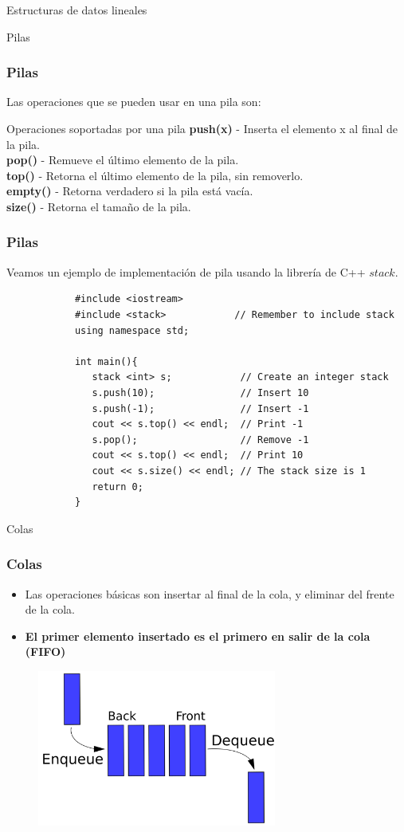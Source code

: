 \documentclass{beamer}
\begin{document}
\begin{section}{Estructuras de datos lineales}
\begin{subsection}{Pilas}
	\begin{frame}[fragile]
		\frametitle{Pilas}
		Las operaciones que se pueden usar en una pila son:
		\begin{block}{Operaciones soportadas por una pila}
			\textbf{push(x)} - Inserta el elemento x al final de la pila.\\
			\textbf{pop()} - Remueve el último elemento de la pila.\\
			\textbf{top()} - Retorna el último elemento de la pila, sin removerlo.\\
			\textbf{empty()} - Retorna verdadero si la pila está vacía.\\
			\textbf{size()} - Retorna el tamaño de la pila.			
		\end{block}		
	\end{frame}
	
	\begin{frame}[fragile]
		\frametitle{Pilas}
		Veamos un ejemplo de implementación de pila usando la librería de C++ $stack$.
		\begin{lstlisting}
			#include <iostream>
			#include <stack>            // Remember to include stack
			using namespace std;

			int main(){
			   stack <int> s;            // Create an integer stack
			   s.push(10);               // Insert 10
			   s.push(-1);               // Insert -1
			   cout << s.top() << endl;  // Print -1
			   s.pop();                  // Remove -1
			   cout << s.top() << endl;  // Print 10
			   cout << s.size() << endl; // The stack size is 1
			   return 0;
			}
		\end{lstlisting}
	\end{frame}

\end{subsection}


\begin{subsection}{Colas}
	\begin{frame}[fragile]
		\frametitle{Colas}
		\begin{itemize}
			\item {Las operaciones básicas son insertar al final de la cola, y eliminar del frente de la cola.}
			\item {\textbf{El primer elemento insertado es el primero en salir de la cola (FIFO)}}
		\end{itemize}
		\begin{figure}
			\includegraphics[width = 0.7\textwidth]{src/cola.jpg}
		\end{figure}
	\end{frame}


\end{subsection}
\end{section}
\end{document}
